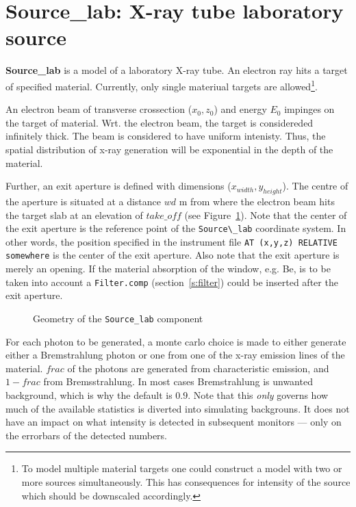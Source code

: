 \section{Source\_lab: X-ray tube laboratory source}
\label{s:source-div}


\textbf{Source\_lab} is a model of a laboratory X-ray tube. An electron ray hits a
target of specified material. Currently, only single materiual targets are
allowed\footnote{To model multiple material targets one could construct a model with two
or more sources simultaneously. This has consequences for intensity of the source which should be downscaled accordingly.}.

An electron beam of transverse crossection ($x_0,z_0$) and energy $E_0$
impinges on the target of material. Wrt. the electron beam, the target is
considereded infinitely thick. The beam is considered to have uniform
intenisty. Thus, the spatial distribution of x-ray generation will be
exponential in the depth of the material.

Further, an exit aperture is defined with dimensions ($x_{width},y_{height}$). The centre of the aperture is situated at a distance $wd$ m from where the electron beam hits the target slab at an elevation of $take\_off$ (see Figure~\ref{f:source_lab}).  
Note that the center of the exit aperture is the reference point of the
\verb+Source\_lab+ coordinate system. In other words, the position specified in
the instrument file \verb+AT (x,y,z) RELATIVE somewhere+ is the center of the
exit aperture. Also note that the exit aperture is merely an opening. If the material absorption of the window, e.g. Be, is to be taken into account a \verb+Filter.comp+ (section~\ref{s:filter}) could be inserted after the exit aperture. 

\begin{figure}
\label{f:source_lab}
\caption{Geometry of the \texttt{Source\_lab} component} 
\end{figure}

For each photon to be generated, a monte carlo choice is made to either
generate either a Bremstrahlung photon or one from one of the x-ray emission
lines of the material. $frac$ of the photons are generated from characteristic
emission, and $1-frac$ from Bremsstrahlung. In most cases Bremstrahlung is
unwanted background, which is why the default is $0.9$. Note that this
\emph{only} governs how much of the available statistics is diverted into
simulating backgrouns. It does not have an impact on what intensity is detected
in subsequent monitors --- only on the errorbars of the detected numbers.

